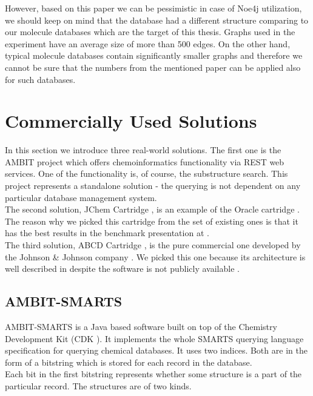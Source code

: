 However, based on this paper we can be pessimistic in case of Noe4j utilization, we should keep on mind that the database had a different structure comparing to our molecule databases which are the target of this thesis. Graphs used in the experiment have an average size of more than 500 edges. On the other hand, typical molecule databases contain significantly smaller graphs and therefore we cannot be sure that the numbers from the mentioned paper can be applied also for such databases.

\section{Commercially Used Solutions}

In this section we introduce three real-world solutions. The first one is the AMBIT project \cite{Ambit} which offers chemoinformatics functionality via REST web services. One of the functionality is, of course, the substructure search. This project represents a standalone solution - the querying is not dependent on any particular database management system.\\

The second solution, JChem Cartridge \cite{JChem}, is an example of the Oracle cartridge \cite{cartridge}. The reason why we picked this cartridge from the set of existing ones is that it has the best results in the benchmark presentation at \cite{benchmarkPresentation}.\\

The third solution, ABCD Cartridge \cite{ABCD}, is the pure commercial one developed by the Johnson \& Johnson company \cite{JJ}. We picked this one because its architecture is well described in \cite{ABCD} despite the software is not publicly available .

\subsection{AMBIT-SMARTS}

AMBIT-SMARTS is a Java based software built on top of the Chemistry Development Kit (CDK \cite{CDK}). It implements the whole SMARTS querying language specification \cite{SMARTS} for querying chemical databases. It uses two indices. Both are in the form of a bitstring which is stored for each record in the database.\\

Each bit in the first bitstring represents whether some structure is a part of the particular record. The structures are of two kinds.\\

